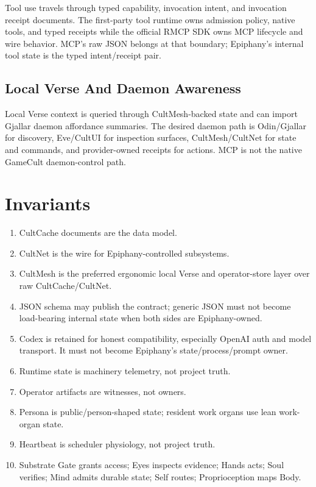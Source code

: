 \documentclass[11pt]{article}
\begin{document}
Tool use travels through typed capability, invocation intent, and invocation
receipt documents. The first-party tool runtime owns admission policy, native
tools, and typed receipts while the official RMCP SDK owns MCP lifecycle and
wire behavior. MCP's raw JSON belongs at that boundary; Epiphany's internal
tool state is the typed intent/receipt pair.

\subsection{Local Verse And Daemon Awareness}

Local Verse context is queried through CultMesh-backed state and can import
Gjallar daemon affordance summaries. The desired daemon path is Odin/Gjallar for
discovery, Eve/CultUI for inspection surfaces, CultMesh/CultNet for state and
commands, and provider-owned receipts for actions. MCP is not the native
GameCult daemon-control path.

\section{Invariants}

\begin{enumerate}
  \item CultCache documents are the data model.
  \item CultNet is the wire for Epiphany-controlled subsystems.
  \item CultMesh is the preferred ergonomic local Verse and operator-store
  layer over raw CultCache/CultNet.
  \item JSON schema may publish the contract; generic JSON must not become
  load-bearing internal state when both sides are Epiphany-owned.
  \item Codex is retained for honest compatibility, especially OpenAI auth and
  model transport. It must not become Epiphany's state/process/prompt owner.
  \item Runtime state is machinery telemetry, not project truth.
  \item Operator artifacts are witnesses, not owners.
  \item Persona is public/person-shaped state; resident work organs use lean
  work-organ state.
  \item Heartbeat is scheduler physiology, not project truth.
  \item Substrate Gate grants access; Eyes inspects evidence; Hands acts; Soul
  verifies; Mind admits durable state; Self routes; Proprioception maps Body.
\end{enumerate}
\end{document}
